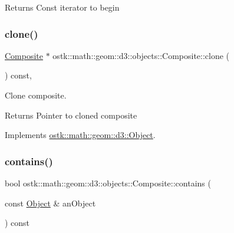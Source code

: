 \begin{DoxyReturn}{Returns}
Const iterator to begin 
\end{DoxyReturn}
\mbox{\label{classostk_1_1math_1_1geom_1_1d3_1_1objects_1_1_composite_a3fa42c990116bf5537c943c404fa8fdd}} 
\subsubsection{\texorpdfstring{clone()}{clone()}}
{\footnotesize\ttfamily \hyperlink{classostk_1_1math_1_1geom_1_1d3_1_1objects_1_1_composite}{Composite} $\ast$ ostk\+::math\+::geom\+::d3\+::objects\+::\+Composite\+::clone (\begin{DoxyParamCaption}{ }\end{DoxyParamCaption}) const\hspace{0.3cm}{\ttfamily [override]}, {\ttfamily [virtual]}}



Clone composite. 

\begin{DoxyReturn}{Returns}
Pointer to cloned composite 
\end{DoxyReturn}


Implements \hyperlink{classostk_1_1math_1_1geom_1_1d3_1_1_object_a676013f9555f6492687f9809b2db887b}{ostk\+::math\+::geom\+::d3\+::\+Object}.

\mbox{\label{classostk_1_1math_1_1geom_1_1d3_1_1objects_1_1_composite_abe810bb7e17c444b1b556053e32750d1}} 
\subsubsection{\texorpdfstring{contains()}{contains()}\hspace{0.1cm}{\footnotesize\ttfamily [1/2]}}
{\footnotesize\ttfamily bool ostk\+::math\+::geom\+::d3\+::objects\+::\+Composite\+::contains (\begin{DoxyParamCaption}\item[{const \hyperlink{classostk_1_1math_1_1geom_1_1d3_1_1_object}{Object} \&}]{an\+Object }\end{DoxyParamCaption}) const\hspace{0.3cm}{\ttfamily [virtual]}}



